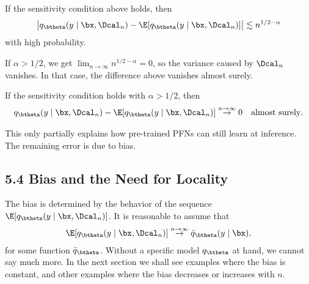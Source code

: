 \documentclass[aspectratio=169,10pt]{beamer}
\newcommand{\currentheading}{\ifx\insertsubsection\empty\insertsection\else\insertsubsection\fi}
\begin{document}
\begin{frame}{\currentheading}
\begin{theorem}[5.2]\label{thm:variance}
If the sensitivity condition above holds, then
\begin{align*}
	\bigl| q_{\btheta}(y \mid \bx, \Dcal_n) - \E[q_{\btheta}(y \mid \bx, \Dcal_n)] \bigr| \lesssim n^{1/2 - \alpha}
\end{align*}
with high probability.
\end{theorem}
\end{frame}

\begin{frame}{\currentheading}
If $\alpha > 1/2$, we get $\lim_{n \to \infty} n^{1/2 - \alpha} = 0$, so the variance caused by $\Dcal_n$ vanishes. In that case, the difference above vanishes almost surely.
\end{frame}

\begin{frame}{\currentheading}
\begin{lemma}[5.3]\label{thm:variance-as}
If the sensitivity condition holds with $\alpha > 1/2$, then
\begin{align*}
  q_{\btheta}(y \mid \bx, \Dcal_n) - \E[q_{\btheta}(y \mid \bx, \Dcal_n)]  \stackrel{n \to \infty}\rightarrow 0 \quad \text{almost surely}.
\end{align*}
\end{lemma}
\end{frame}

\begin{frame}{\currentheading}
This only partially explains how pre-trained PFNs can still learn at inference. The remaining error is due to bias.
\end{frame}

\subsection{5.4 Bias and the Need for Locality}

\begin{frame}{\currentheading}
The bias is determined by the behavior of the sequence $\E[q_{\btheta}(y \mid \bx, \Dcal_n)]$. It is reasonable to assume that
\begin{align*}
	 \E[q_{\btheta}(y \mid \bx, \Dcal_n)] \stackrel{n \to \infty}\rightarrow  \bar q_{\btheta}(y \mid \bx),
\end{align*}
for some function $\bar q_{\btheta}$. Without a specific model $q_{\btheta}$ at hand, we cannot say much more. In the next section we shall see examples where the bias is constant, and other examples where the bias decreases or increases with $n$.
\end{frame}
\end{document}
